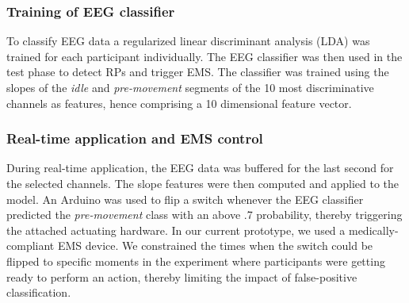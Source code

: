 \subsubsection{Training of EEG classifier}
To classify EEG data a regularized linear discriminant analysis (LDA) was trained for each participant individually. The EEG classifier was then used in the test phase to detect RPs and trigger EMS. The classifier was trained using the slopes of the \textit{idle} and \textit{pre-movement} segments of the 10 most discriminative channels as features, hence comprising a 10 dimensional feature vector.

\subsubsection{Real-time application and EMS control}
During real-time application, the EEG data was buffered for the last second for the selected channels. The slope features were then computed and applied to the model. An Arduino was used to flip a switch whenever the EEG classifier predicted the \textit{pre-movement} class with an above .7 probability, thereby triggering the attached actuating hardware. 
In our current prototype, we used a medically-compliant EMS device. We constrained the times when the switch could be flipped to specific moments in the experiment where participants were getting ready to perform an action, thereby limiting the impact of false-positive classification. 



